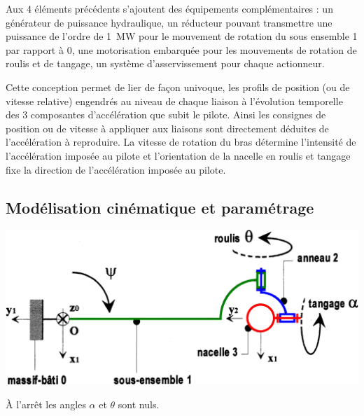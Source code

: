 \documentclass[10pt,fleqn]{article} %
\begin{document}
\begin{multicols}{2}
Aux 4 éléments précédents s’ajoutent des équipements complémentaires : un générateur de puissance
hydraulique, un réducteur pouvant transmettre une puissance de l’ordre de \SI{1}{MW} pour le mouvement de
rotation du sous ensemble 1 par rapport à 0, une motorisation embarquée pour les mouvements de rotation
de roulis et de tangage, un système d’asservissement pour chaque actionneur.

Cette conception permet de lier de façon univoque, les profils de position (ou de vitesse relative) engendrés
au niveau de chaque liaison à l’évolution temporelle des 3 composantes d’accélération que subit le pilote.
Ainsi les consignes de position ou de vitesse à appliquer aux liaisons sont directement déduites de
l’accélération à reproduire. La vitesse de rotation du bras détermine l’intensité de l’accélération imposée au
pilote et l’orientation de la nacelle en roulis et tangage fixe la direction de l’accélération imposée au pilote.

\subsection*{Modélisation cinématique et paramétrage}
\begin{center}
\includegraphics[width=\linewidth]{images/fig_02.png}
\end{center}

À l'arrêt les angles $\alpha$ et $\theta$ sont nuls.


\end{multicols}
\end{document}
